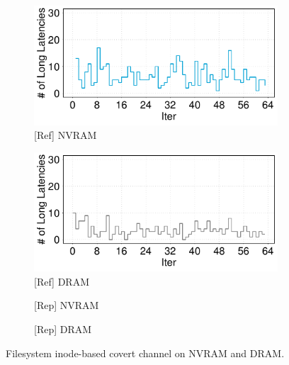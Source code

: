 
\begin{figure}[t]
    \centering

    \begin{subfigure}[b]{.23\linewidth}
        \centering
        \includegraphics[width=\linewidth]{figure/plot/reference/fig10a-covert-inode-pmem.tikz.pdf}
        \caption{[Ref] NVRAM}
        \label{fig:10:ref:covert-inode-nvram}
    \end{subfigure}
    \hfill
    \begin{subfigure}[b]{.23\linewidth}
        \centering
        \includegraphics[width=\linewidth]{figure/plot/reference/fig10b-covert-inode-dram.tikz.pdf}
        \caption{[Ref] DRAM}
        \label{fig:10:ref:covert-inode-dram}
    \end{subfigure}
    \hfill
    \begin{subfigure}[b]{.23\linewidth}
        \centering
        \caption{[Rep] NVRAM}
        \label{fig:10:rep:covert-inode-nvram}
    \end{subfigure}
    \hfill
    \begin{subfigure}[b]{.23\linewidth}
        \centering
        \caption{[Rep] DRAM}
        \label{fig:10:rep:covert-inode-dram}
    \end{subfigure}

    \caption{Filesystem inode-based covert channel on NVRAM and DRAM.}
    \label{fig:10:covert-inode}
\end{figure}
